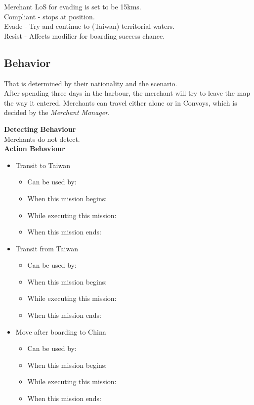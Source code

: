 \documentclass{article}
\begin{document}
\noindent Merchant LoS for evading is set to be 15kms. \\
Compliant - stops at position.\\
Evade - Try and continue to (Taiwan) territorial waters.\\
Resist - Affects modifier for boarding success chance.\\
\subsection{Behavior}
    

    
    That is determined by their nationality and the scenario.\\

\noindent After spending three days in the harbour, the merchant will try to leave the map the way it entered. Merchants can travel either alone or in Convoys, which is decided by the \textit{Merchant Manager}. 


    \noindent \textbf{Detecting Behaviour} \\
        Merchants do not detect. \\

    \noindent \textbf{Action Behaviour} \\
        \begin{itemize}
            \item Transit to Taiwan
            \begin{itemize}
                \item{Can be used by:} 
                \item{When this mission begins:}
                \item{While executing this mission:}
                \item{When this mission ends:} 
            \end{itemize}
            \item Transit from Taiwan
            \begin{itemize}
                \item{Can be used by:} 
                \item{When this mission begins:}
                \item{While executing this mission:}
                \item{When this mission ends:} 
            \end{itemize}
            \item Move after boarding to China
            \begin{itemize}
                \item{Can be used by:} 
                \item{When this mission begins:}
                \item{While executing this mission:}
                \item{When this mission ends:} 
            \end{itemize}
        \end{itemize}
        
\end{document}
